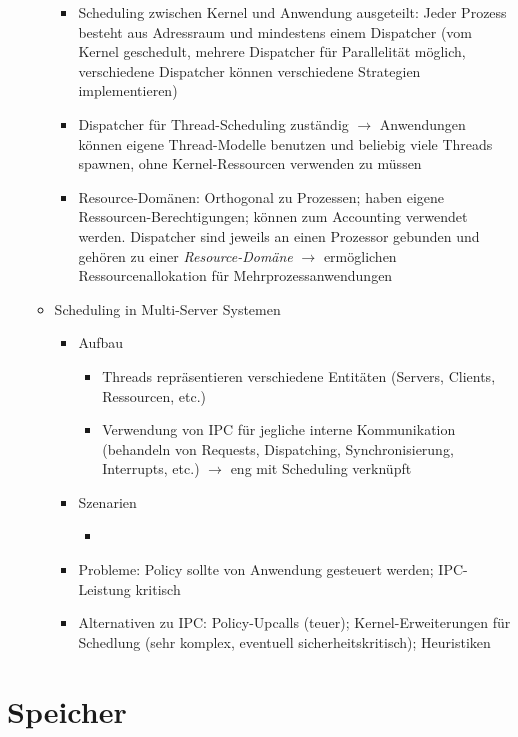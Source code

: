 \begin{itemize}
\begin{itemize}
\begin{itemize}
			\item Scheduling zwischen Kernel und Anwendung ausgeteilt: Jeder Prozess besteht aus Adressraum und mindestens einem Dispatcher (vom Kernel geschedult, mehrere Dispatcher für Parallelität möglich, verschiedene Dispatcher können verschiedene Strategien implementieren)
			\item Dispatcher für Thread-Scheduling zuständig \(\rightarrow\) Anwendungen können eigene Thread-Modelle benutzen und beliebig viele Threads spawnen, ohne Kernel-Ressourcen verwenden zu müssen
			\item Resource-Domänen: Orthogonal zu Prozessen; haben eigene Ressourcen-Berechtigungen; können zum Accounting verwendet werden. Dispatcher sind jeweils an einen Prozessor gebunden und gehören zu einer \textit{Resource-Domäne} \(\rightarrow\) ermöglichen Ressourcenallokation für Mehrprozessanwendungen
		\end{itemize}
		\item Scheduling in Multi-Server Systemen
		\begin{itemize}
			\item Aufbau
			\begin{itemize}
				\item Threads repräsentieren verschiedene Entitäten (Servers, Clients, Ressourcen, etc.)
				\item Verwendung von IPC für jegliche interne Kommunikation (behandeln von Requests, Dispatching, Synchronisierung, Interrupts, etc.) \(\rightarrow\) eng mit Scheduling verknüpft
			\end{itemize}
			\item Szenarien
			\begin{itemize}
				\item %
			\end{itemize}
			\item Probleme: Policy sollte von Anwendung gesteuert werden; IPC-Leistung kritisch
			\item Alternativen zu IPC: Policy-Upcalls (teuer); Kernel-Erweiterungen für Schedlung (sehr komplex, eventuell sicherheitskritisch); Heuristiken
		\end{itemize}
	\end{itemize}
\end{itemize}



\section{Speicher}

